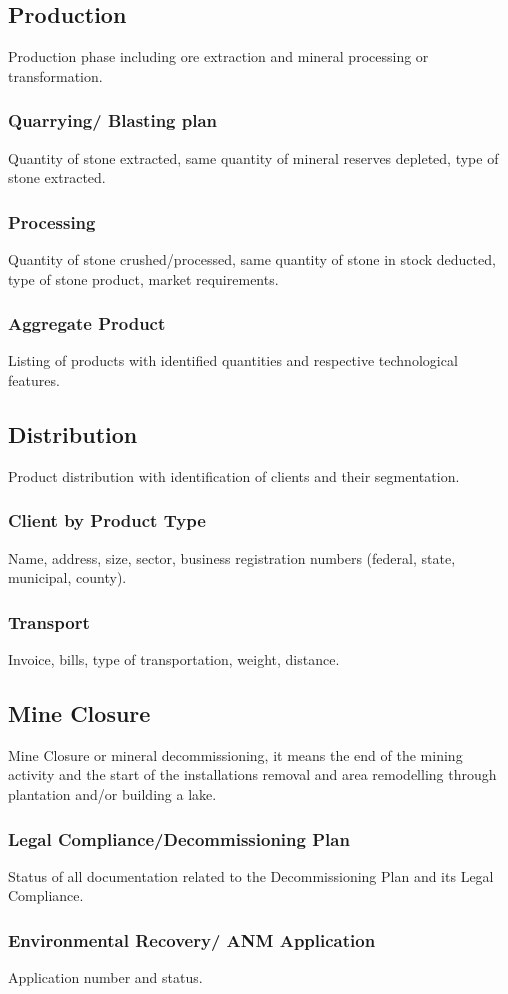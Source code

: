 \subsection{Production}\label{sec:Production}
Production phase including ore extraction and mineral processing or transformation.

\subsubsection{Quarrying/ Blasting plan}\label{sec:Quarrying}
Quantity of stone extracted, same quantity of mineral reserves depleted, type of stone extracted.

\subsubsection{Processing}\label{sec:Processing}
Quantity of stone crushed/processed, same quantity of stone in stock deducted, type of stone product, market requirements.

\subsubsection{Aggregate Product}\label{sec:AggregateProduct}
Listing of products with identified quantities and respective technological features.

\subsection{Distribution}\label{sec:Distribution}
Product distribution with identification of clients and their segmentation. 

\subsubsection{Client by Product Type}\label{sec:Client}
Name, address, size, sector, business registration numbers (federal, state, municipal, county).

\subsubsection{Transport}\label{sec:Transport}
Invoice, bills, type of transportation, weight, distance.

\subsection{Mine Closure}\label{sec:MineClosure}
Mine Closure or mineral decommissioning, it means the end of the mining activity and the start of the installations removal and area remodelling through plantation and/or building a lake.

\subsubsection{Legal Compliance/Decommissioning Plan}\label{sec:LegalCompliance}
Status of all documentation related to the Decommissioning Plan and its Legal Compliance.

\subsubsection{Environmental Recovery/ ANM Application}\label{sec:EnvironmentalRecovery}
Application number and status.